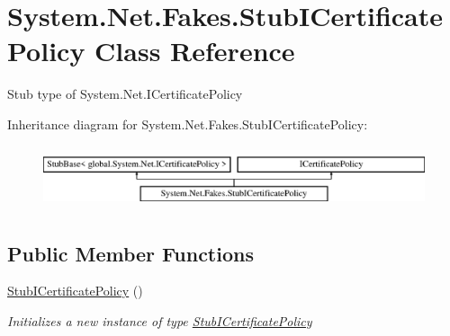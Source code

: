 \hypertarget{class_system_1_1_net_1_1_fakes_1_1_stub_i_certificate_policy}{\section{System.\-Net.\-Fakes.\-Stub\-I\-Certificate\-Policy Class Reference}
\label{class_system_1_1_net_1_1_fakes_1_1_stub_i_certificate_policy}
}


Stub type of System.\-Net.\-I\-Certificate\-Policy 


Inheritance diagram for System.\-Net.\-Fakes.\-Stub\-I\-Certificate\-Policy\-:\begin{figure}[H]
\begin{center}
\leavevmode
\includegraphics[height=1.879195cm]{class_system_1_1_net_1_1_fakes_1_1_stub_i_certificate_policy}
\end{center}
\end{figure}
\subsection*{Public Member Functions}
\begin{DoxyCompactItemize}
\item 
\hyperlink{class_system_1_1_net_1_1_fakes_1_1_stub_i_certificate_policy_a11364709f24e67f0d3206f27878ca12e}{Stub\-I\-Certificate\-Policy} ()
\begin{DoxyCompactList}\small\item\em Initializes a new instance of type \hyperlink{class_system_1_1_net_1_1_fakes_1_1_stub_i_certificate_policy}{Stub\-I\-Certificate\-Policy}\end{DoxyCompactList}\end{DoxyCompactItemize}

